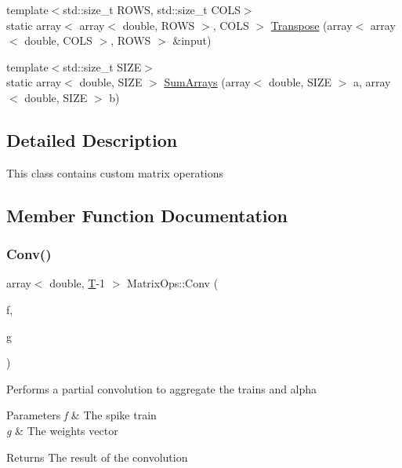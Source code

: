 \begin{DoxyCompactItemize}
\item 
{\footnotesize template$<$std\+::size\+\_\+t R\+O\+WS, std\+::size\+\_\+t C\+O\+LS$>$ }\\static array$<$ array$<$ double, R\+O\+WS $>$, C\+O\+LS $>$ \mbox{\hyperlink{class_matrix_ops_a8f4af29be905aeb6c49c1145603b3197}{Transpose}} (array$<$ array$<$ double, C\+O\+LS $>$, R\+O\+WS $>$ \&input)
\item 
{\footnotesize template$<$std\+::size\+\_\+t S\+I\+ZE$>$ }\\static array$<$ double, S\+I\+ZE $>$ \mbox{\hyperlink{class_matrix_ops_a9122c22f9074462294cbd8bd395cfcae}{Sum\+Arrays}} (array$<$ double, S\+I\+ZE $>$ a, array$<$ double, S\+I\+ZE $>$ b)
\end{DoxyCompactItemize}


\subsection{Detailed Description}
This class contains custom matrix operations 

\subsection{Member Function Documentation}
\mbox{\label{class_matrix_ops_a60b08cd335420a90840d198bb2eefed4}} 
\subsubsection{\texorpdfstring{Conv()}{Conv()}}
{\footnotesize\ttfamily array$<$ double, \mbox{\hyperlink{_constants_8h_a6108cec236ef7a2e1d3259931de87186}{T}}-\/1 $>$ Matrix\+Ops\+::\+Conv (\begin{DoxyParamCaption}\item[{array$<$ bool, \mbox{\hyperlink{_constants_8h_a6108cec236ef7a2e1d3259931de87186}{T}} $>$ const \&}]{f,  }\item[{array$<$ double, \mbox{\hyperlink{_constants_8h_a45bcfb91788c7d66f5de11604fb1eb6e}{T\+YI}} $>$ const \&}]{g }\end{DoxyParamCaption})\hspace{0.3cm}{\ttfamily [static]}}

Performs a partial convolution to aggregate the trains and alpha 
\begin{DoxyParams}{Parameters}
{\em f} & The spike train \\
\hline
{\em g} & The weights vector \\
\hline
\end{DoxyParams}
\begin{DoxyReturn}{Returns}
The result of the convolution 
\end{DoxyReturn}
\mbox{\label{class_matrix_ops_a91f52eb21bae8a73de6367c0c195f0a7}} 
